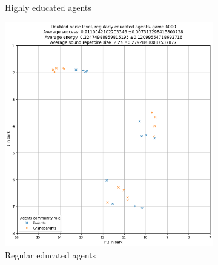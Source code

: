 \begin{figure}[ht]
\begin{subfigure}{.30\textwidth}
        \captionsetup{width=0.9\linewidth}
        \captionsetup{justification=centering}
        \caption{Highly educated agents}
    \end{subfigure}
    \hspace{0.5cm}
    \begin{subfigure}{.30\textwidth}
        \centering
        \includegraphics[width=\textwidth]{images/results/double_noise_regular.png}
        \captionsetup{width=0.9\linewidth}
        \captionsetup{justification=centering}
        \caption{Regular educated agents}
    \end{subfigure}
    \begin{subfigure}{.30\textwidth}
        \centering

\end{subfigure}
\end{figure}
